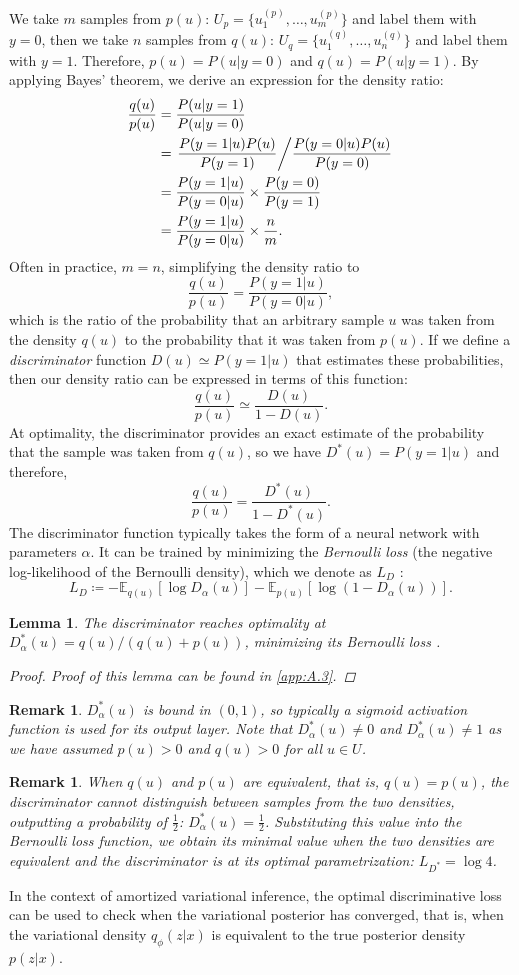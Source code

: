 \documentclass[honours,12pt, twoside]{unswthesis}
\newcommand{\E}{\mathbb{E}}
\newtheorem{lemma}[theorem]{Lemma}
\newtheorem{remark}[theorem]{Remark}
\numberwithin{equation}{section}
\theoremstyle{definition}
\begin{document}
We take $m$ samples from $p(u)$: $U_p=\{u_1^{(p)},\dots,u_m^{(p)}\}$
and label them with $y=0$, then we take $n$ samples from $q(u)$: $U_q=\{u_1^{(q)},\dots, u_n^{(q)}\}$ and label them with $y=1$. Therefore, $p(u)=P(u|y=0)$ and $q(u)=P(u|y=1)$. By applying Bayes' theorem, we derive an expression for the density ratio:
\begin{align*}
\frac{q(u)}{p(u)}&= \frac{P(u|y=1)}{P(u|y=0)}\\
&= \left.\frac{P(y=1|u)P(u)}{P(y=1)}\middle/ \frac{P(y=0|u)P(u)}{P(y=0)}\right.\\
&= \frac{P(y=1|u)}{P(y=0|u)}\times \frac{P(y=0)}{P(y=1)}\\
&= \frac{P(y=1|u)}{P(y=0|u)}\times \frac{n}{m}.
\end{align*}
Often in practice, $m=n$, simplifying the density ratio to
\[\frac{q(u)}{p(u)}=\frac{P(y=1|u)}{P(y=0|u)},\]
which is the ratio of the probability that an arbitrary sample $u$ was taken from the density $q(u)$ to the probability that it was taken from $p(u)$. If we define a \textit{discriminator} function $D(u)\simeq P(y=1|u)$ that estimates these probabilities, then our density ratio can be expressed in terms of this function:
\[\frac{q(u)}{p(u)}\simeq \frac{D(u)}{1-D(u)}.\]
At optimality, the discriminator provides an exact estimate of the probability that the sample was taken from $q(u)$, so we have $D^*(u)=P(y=1|u)$ and therefore,
\[\frac{q(u)}{p(u)}=\frac{D^*(u)}{1-D^*(u)}.\]
The discriminator function typically takes the form of a neural network with parameters $\alpha$. It  can be trained by minimizing the \textit{Bernoulli loss} (the negative log-likelihood of the Bernoulli density), which we denote as $L_D$ \citep{sugiyama}:
\[L_D\coloneqq-\E_{q(u)}[\log D_\alpha(u)]-\E_{p(u)}[\log(1-D_\alpha(u))].\]
\begin{lemma}
The discriminator reaches optimality at $D^*_\alpha(u)=q(u)/(q(u)+p(u))$, minimizing its Bernoulli loss \citep{gan}.
\begin{proof}
Proof of this lemma can be found in \autoref{app:A.3}.
\end{proof}
\end{lemma}
\begin{remark}\label{rem:4.1.2}
$D^*_\alpha(u)$ is bound in $(0,1)$, so typically a sigmoid activation function is used for its output layer. Note that $D^*_\alpha (u)\neq 0$ and $D^*_\alpha(u)\neq 1$ as we have assumed $p(u)>0$ and $q(u)>0$ for all $u\in U$.
\end{remark}
\begin{remark}\label{rem:4.1.3}
When $q(u)$ and $p(u)$ are equivalent, that is, $q(u)=p(u)$, the discriminator cannot distinguish between samples from the two densities, outputting a probability of $\frac{1}{2}$: $D^*_\alpha(u)=\frac{1}{2}$. Substituting this value into the Bernoulli loss function, we obtain its minimal value when the two densities are equivalent and the discriminator is at its optimal parametrization: $L_{D^*}=\log 4$.
\end{remark}
In the context of amortized variational inference, the optimal discriminative loss can be used to check when the variational posterior has converged, that is, when the variational density $q_\phi(z|x)$ is equivalent to the true posterior density $p(z|x)$.
\end{document}
